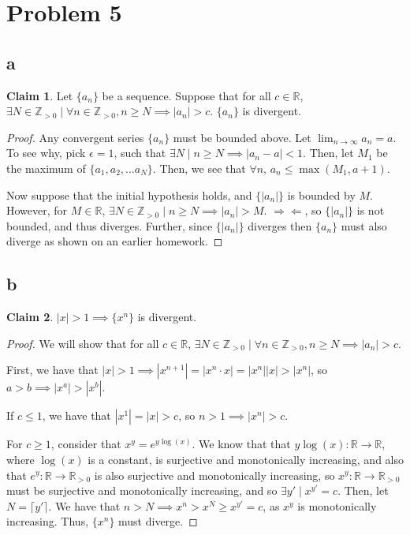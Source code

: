\documentclass[12pt,letterpaper]{article}
\theoremstyle{definition}
\newtheorem*{claim}{Claim}
\newcommand{\contra}{\Rightarrow\!\Leftarrow}
\newcommand{\R}{\mathbb{R}}
\newcommand{\Zg}{\mathbb{Z}_{>0}}
\newcommand{\Rg}{\mathbb{R}_{>0}}
\begin{document}
\section*{Problem 5}
\subsection*{a}

\begin{claim}
  Let $\{ a_n \}$ be a sequence. Suppose that for all $c \in \R$, $\exists  N
  \in \Zg \mid \forall n \in \Zg, n \geq N \implies |a_n| > c$. $\{a_n\}$ is divergent.
\end{claim}

\begin{proof}
  Any convergent series $\{ a_n \}$ must be bounded above. Let $\lim_{n\rightarrow
    \infty}a_n = a$. To see why, pick $\epsilon = 1$, such that $\exists N \mid
  n \geq N \implies |a_n - a| < 1$. Then, let $M_1$ be the maximum of
  $\{a_1,a_2,...a_N\}$. Then, we see that $\forall n$, $a_n \leq \max(M_1, a + 1)$.

  Now suppose that the initial hypothesis holds, and $\{ |a_n| \}$ is bounded by
  $M$. However, for $M \in \R$, $\exists N \in \Zg \mid n \geq N \implies
  |a_n| > M$. $\contra$, so $\{ |a_n| \}$ is not bounded, and thus diverges.
  Further, since  $\{|a_n|\}$ diverges then $\{a_n\}$ must also diverge as shown
  on an earlier homework.
\end{proof}

\subsection*{b}

\begin{claim}
  $|x| > 1 \implies \{x^n\}$ is divergent.
\end{claim}

\begin{proof}
  We will show that for all $c \in \R$, $\exists N \in \Zg \mid \forall n \in
  \Zg, n \geq N \implies |a_n| > c$.
  
  First, we have that $|x| > 1 \implies |x^{n+1}| = |x^n \cdot x| = |x^n||x| >
  |x^n|$, so $a > b \implies |x^a| > |x^b|$.

  If $c \leq 1$, we have that $|x^1| = |x| > c$, so $n > 1 \implies |x^n| > c$.
 
  For $c \geq 1$, consider that $x^y = e^{y\log(x)}$. We know that that $y\log(x): \R
  \rightarrow \R$, where $\log(x)$ is a constant, is surjective and
  monotonically increasing, and also that $e^y: \R \rightarrow \Rg$ is also
  surjective and monotonically increasing, so $x^y: \R \rightarrow \Rg$ must be
  surjective and monotonically increasing, and so $\exists y' \mid x^{y'} = c$.
  Then, let $N = \lceil y' \rceil$. We have that $n > N \implies x^n > x^N \geq
  x^{y'} = c$, as $x^{y}$ is monotonically increasing. Thus, $\{x^n\}$ must diverge.
\end{proof}
\end{document}
